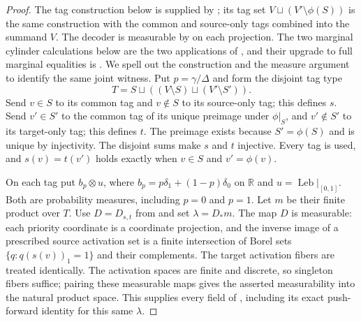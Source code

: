\begin{proof}
The tag construction below is supplied by ;
its tag set $V\sqcup(V'\setminus\phi(S))$ is the same construction with
the common and source-only tags combined into the summand $V$.
The decoder is measurable by 
on each projection. The two marginal cylinder calculations below are the
two applications of , and
their upgrade to full marginal equalities is
. We spell out the
construction and the measure argument to identify the same joint witness.
Put $p=\gamma/\Delta$ and form the disjoint tag type
\[
T=S\sqcup((V\setminus S)\sqcup(V'\setminus S')).
\]
Send $v\in S$ to its common tag and $v\notin S$ to its source-only tag;
this defines $s$. Send $v'\in S'$ to the common tag of its unique preimage
under $\phi|_S$, and $v'\notin S'$ to its target-only tag; this defines $t$.
The preimage exists because $S'=\phi(S)$ and is unique by injectivity.
The disjoint sums make $s$ and $t$ injective. Every tag is used, and
$s(v)=t(v')$ holds exactly when $v\in S$ and $v'=\phi(v)$.

On each tag put $b_p\otimes u$, where $b_p=p\delta_1+(1-p)\delta_0$ on
$\mathbb R$ and $u=\operatorname{Leb}|_{[0,1]}$. Both are probability
measures, including $p=0$ and $p=1$. Let $m$ be their finite product over $T$.
Use $D=D_{s,t}$ from 
and set $\lambda=D_*m$. The map $D$ is measurable: each priority coordinate
is a coordinate projection, and the inverse image of a prescribed source
activation set is a finite intersection of Borel sets
$\{q:q(s(v))_1=1\}$ and their complements. The target activation fibers
are treated identically. The activation spaces are finite and discrete, so
singleton fibers suffice; pairing these measurable maps gives the asserted
measurability into the natural product space. This supplies every field of
, including its
exact push-forward identity for this same $\lambda$.


\end{proof}
